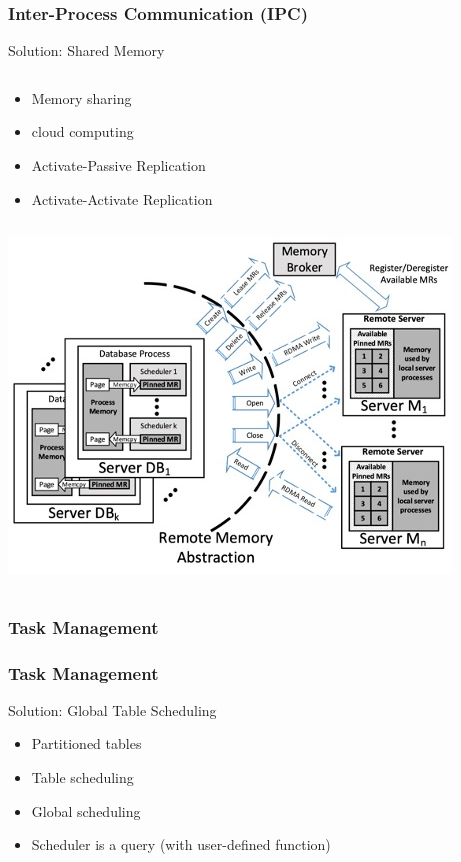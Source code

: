 \begin{frame}
\frametitle{Inter-Process Communication (IPC)}
\begin{block}{Solution: Shared Memory}
\begin{column}{.5\textwidth}
\begin{itemize}
	\item Memory sharing
	\item cloud computing 
	\item Activate-Passive Replication
	\item Activate-Activate Replication
\end{itemize} 
\end{column}
\begin{column}{.5\textwidth}
\includegraphics[width=\textwidth]{fig23/rdma5.jpg}
\end{column}
\end{block}
\end{frame}


\subsubsection{Task Management}

\begin{frame}
\frametitle{Task Management}
\begin{block}{Solution: Global Table Scheduling}
\begin{itemize}
	\item Partitioned tables
	\item Table scheduling  
	\item Global scheduling
	\item Scheduler is a query (with user-defined function)
\end{itemize} 
\end{block}
\end{frame}



